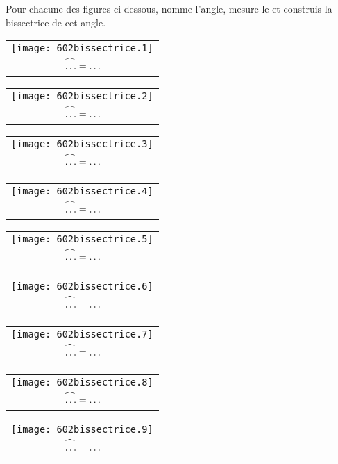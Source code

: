 Pour chacune des figures ci-dessous, nomme l'angle, mesure-le et construis la bissectrice de cet angle.
\par
\begin{tabular}{c}
\texttt{[image: 602bissectrice.1]}\\
$\widehat{\strut\ldots}=\ldots$\\
\end{tabular}
\hfill
\begin{tabular}{c}
\texttt{[image: 602bissectrice.2]}\\
$\widehat{\strut\ldots}=\ldots$\\
\end{tabular}
\hfill
\begin{tabular}{c}
\texttt{[image: 602bissectrice.3]}\\
$\widehat{\strut\ldots}=\ldots$\\
\end{tabular}
\par
\begin{tabular}{c}
\texttt{[image: 602bissectrice.4]}\\
$\widehat{\strut\ldots}=\ldots$\\
\end{tabular}
\hfill
\begin{tabular}{c}
\texttt{[image: 602bissectrice.5]}\\
$\widehat{\strut\ldots}=\ldots$\\
\end{tabular}
\hfill
\begin{tabular}{c}
\texttt{[image: 602bissectrice.6]}\\
$\widehat{\strut\ldots}=\ldots$\\
\end{tabular}
\par
\begin{tabular}{c}
\texttt{[image: 602bissectrice.7]}\\
$\widehat{\strut\ldots}=\ldots$\\
\end{tabular}
\hfill
\begin{tabular}{c}
\texttt{[image: 602bissectrice.8]}\\
$\widehat{\strut\ldots}=\ldots$\\
\end{tabular}
\hfill
\begin{tabular}{c}
\texttt{[image: 602bissectrice.9]}\\
$\widehat{\strut\ldots}=\ldots$\\
\end{tabular}

